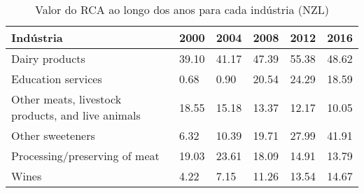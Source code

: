 \begin{table}
\centering
\caption{Valor do RCA ao longo dos anos para cada indústria (NZL)}
\label{tab:ex3-tempo-NZL}
\begin{tabular}{p{6cm}p{1.5cm}p{1.5cm}p{1.5cm}p{1.5cm}p{1.5cm}}
\toprule
                                        Indústria &  2000 &  2004 &  2008 &  2012 &  2016 \\
\midrule
                                   Dairy products & 39.10 & 41.17 & 47.39 & 55.38 & 48.62 \\
                               Education services &  0.68 &  0.90 & 20.54 & 24.29 & 18.59 \\
Other meats, livestock products, and live animals & 18.55 & 15.18 & 13.37 & 12.17 & 10.05 \\
                                 Other sweeteners &  6.32 & 10.39 & 19.71 & 27.99 & 41.91 \\
                    Processing/preserving of meat & 19.03 & 23.61 & 18.09 & 14.91 & 13.79 \\
                                            Wines &  4.22 &  7.15 & 11.26 & 13.54 & 14.67 \\
\bottomrule
\end{tabular}
\end{table}
